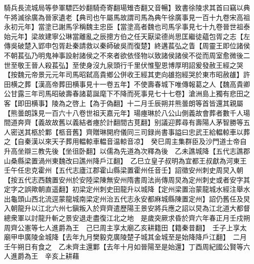 騎兵長流城局等參軍驃匹妙翻騎奇寄翻瑒雉杏翻又音暢】致書徐陵求其首曰竊以典午將滅徐廣為晉家遺老【典司也午屬馬故謂司馬為典午徐廣事見一百十九卷宋高祖永初元年】當塗已謝馬孚稱魏主忠臣【當塗高者魏也司馬孚事見七十九卷晉世祖泰始元年】梁故建寧公琳當離亂之辰摠方伯之任天厭梁德尚思匡繼徒藴包胥之志【左傳吳破楚入郢申包胥赴秦請救以秦師破吳而復楚】終遘萇弘之眚【周靈王即位諸侯不朝萇弘乃明鬼神事設射諸侯之不來者欲依怪物以致諸侯諸侯不從而周室愈微後二世至敬王晉人殺萇弘】至使身沒九泉頭行千里伏惟聖恩博厚明詔爰發赦王經之哭【按魏元帝景元元年司馬昭弑高貴鄉公併收王經其吏向䧺抱經哭於東市昭赦䧺】許田横之葬【漢高帝葬田横事見十一卷五年】不使壽春城下唯傳報葛之人【魏高貴卿公甘露三年司馬昭破壽春諸葛誕麾下不降而死事見七十七卷】滄洲島上獨有悲田之客【即田横事】陵為之啓上【為于偽翻】十二月壬辰朔并熊曇朗等首皆還其親屬【熊曇朗誅見一百六十八卷世祖天嘉元年】瑒瘞琳於八公山側義故會葬者數千人瑒間道奔齊【義故故舊以義結者瘞於計翻間古莧翻】别議迎葬尋有壽陽人茅智勝等五人密送其柩於鄴【柩音舊】齊贈琳開府儀同三司録尚書事謚曰忠武王給輼輬車以葬之【自秦漢以來天子葬用輼輬車輼音温輬音凉】　癸巳周主集群臣及沙門道士帝自升高坐辯三教先後【坐徂卧翻】以儒為先道為次釋為後　乙未譙城降【五代志譙郡山桑縣梁置渦州東魏改曰譙州降戶江翻】　乙巳立皇子叔明為宜都王叔獻為河東王　壬午任忠克霍州【五代志廬江郡霍山縣梁置霍州任音壬】詔徵安州刺史周炅入朝【按五代志西魏置安州於安陸梁陳無安州隋書周法尚傳周炅為定州刺史或者安字其定字之誤歟朝直遥翻】初梁定州刺史田龍升以城降【定州梁置治蒙龍城水經注舉水出龜頭山西北流逕蒙龍城南梁定州治五代志永安都麻城縣陳置定州】詔仍舊任及炅入朝龍升以江北六州七鎭叛入於齊齊遣歷陽王景安將兵應之詔以炅為江北道大都督總衆軍以討龍升斬之景安退走盡復江北之地　是歲突厥求昏於齊六年春正月壬戍朔周齊公憲等七人進爵為王　己巳周主享太廟乙亥耕籍田【籍秦昔翻】　壬子上享太廟甲申廣陵金城降【去年九月樊毅克廣陵楚子城其金城至是始降降戶江翻】　二月壬午朔日有食之　乙未齊主還鄴【去年十月如晉陽至是始還】丁酉周紀國公賢等六人進爵為王　辛亥上耕藉

